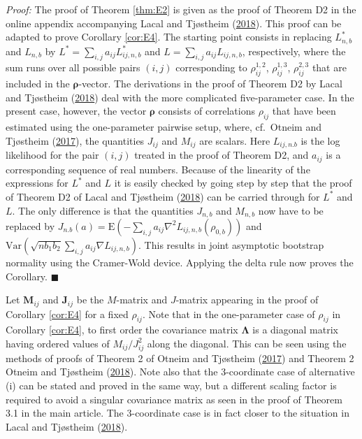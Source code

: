 \documentclass[
  12pt,
  letterpaper]{article}
\numberwithin{equation}{section}
\newcommand{\M}{\bm{M}}
\newcommand{\J}{\bm{J}}
\newcommand{\frho}{\bm{\rho}}
\newcommand{\fLambda}{\bm{\Lambda}}
\newcommand{\E}{\textrm{E}}
\newcommand{\Var}{\textrm{Var}}
\begin{document}
\emph{Proof:} The proof of Theorem \ref{thm:E2} is given as the proof of Theorem D2 in the online appendix accompanying Lacal and Tjøstheim (\protect\hyperlink{ref-lacal2018estimating}{2018}). This proof can be adapted to prove Corollary \ref{cor:E4}. The starting point consists in replacing \(L_{n,b}^*\) and \(L_{n,b}\) by \(L^* = \sum_{i,j} a_{ij}L_{ij,n,b}^*\) and \(L = \sum_{i,j}a_{ij}L_{ij,n,b}\), respectively, where the sum runs over all possible pairs \((i,j)\) corresponding to \(\rho_{ij}^{1,2}\), \(\rho_{ij}^{1,3}\), \(\rho_{ij}^{2,3}\) that are included in the \(\frho\)-vector. The derivations in the proof of Theorem D2 by Lacal and Tjøstheim (\protect\hyperlink{ref-lacal2018estimating}{2018}) deal with the more complicated five-parameter case. In the present case, however, the vector \(\frho\) consists of correlations \(\rho_{ij}\) that have been estimated using the one-parameter pairwise setup, where, cf.~Otneim and Tjøstheim (\protect\hyperlink{ref-otneim2017locally}{2017}), the quantities \(J_{ij}\) and \(M_{ij}\) are scalars. Here \(L_{ij,n.b}\) is the log likelihood for the pair \((i,j)\) treated in the proof of Theorem D2, and \(a_{ij}\) is a corresponding sequence of real numbers. Because of the linearity of the expressions for \(L^*\) and \(L\) it is easily checked by going step by step that the proof of Theorem D2 of Lacal and Tjøstheim (\protect\hyperlink{ref-lacal2018estimating}{2018}) can be carried through for \(L^*\) and \(L\). The only difference is that the quantities \(J_{n,b}\) and \(M_{n,b}\) now have to be replaced by \(J_{n.b}(a) = \E(-\sum_{i,j}a_{ij}\nabla^2 L_{ij,n,b}(\rho_{0,b}))\) and \(\Var(\sqrt{nb_1b_2}\sum_{i,j} a_{ij}\nabla L_{ij,n,b})\). This results in joint asymptotic bootstrap normality using the Cramer-Wold device. Applying the delta rule now proves the Corollary. \(\blacksquare\)

Let \(\M_{ij}\) and \(\J_{ij}\) be the \(M\)-matrix and \(J\)-matrix appearing in the proof of Corollary \ref{cor:E4} for a fixed \(\rho_{ij}\). Note that in the one-parameter case of \(\rho_{ij}\) in Corollary \ref{cor:E4}, to first order the covariance matrix \(\fLambda\) is a diagonal matrix having ordered values of \(M_{ij}/J_{ij}^2\) along the diagonal. This can be seen using the methods of proofs of Theorem 2 of Otneim and Tjøstheim (\protect\hyperlink{ref-otneim2017locally}{2017}) and Theorem 2 Otneim and Tjøstheim (\protect\hyperlink{ref-otneim2017conditional}{2018}). Note also that the 3-coordinate case of alternative (i) can be stated and proved in the same way, but a different scaling factor is required to avoid a singular covariance matrix as seen in the proof of Theorem 3.1 in the main article. The 3-coordinate case is in fact closer to the situation in Lacal and Tjøstheim (\protect\hyperlink{ref-lacal2018estimating}{2018}).
\end{document}
